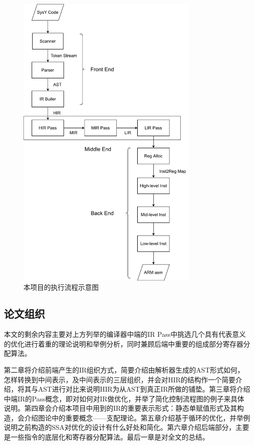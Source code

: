 \begin{figure}[htb]
  \centering
  \includegraphics[width=0.8\textwidth]{figures/flammingmycompiler.pdf}
  \caption{本项目的执行流程示意图}
  \label{fig:compiler}
\end{figure}

\subsection{论文组织}

本文的剩余内容主要对上方列举的编译器中端的IR Pass中挑选几个具有代表意义的优化进行着重的理论说明和举例分析，同时兼顾后端中重要的组成部分寄存器分配算法。

第二章将介绍前端产生的IR组织方式，简要介绍由解析器生成的AST形式如何，怎样转换到中间表示，及中间表示的三层组织，并会对HIR的结构作一个简要介绍，将其与AST进行对比来说明HIR为从AST到真正IR所做的铺垫。第三章将介绍中端IR的Pass概念，即对如何对IR做优化，并举了简化控制流程图的例子来具体说明。第四章会介绍本项目中用到的IR的重要表示形式：静态单赋值形式及其构造，会介绍图论中的重要概念——支配理论。第五章介绍基于循环的优化，并举例说明之前构造的SSA对优化的设计有什么好处和简化。第六章介绍后端部分，主要是一些指令的底层化和寄存器分配算法。最后一章是对全文的总结。